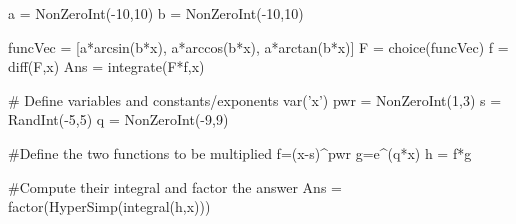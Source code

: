 

\begin{sagesilent}
a = NonZeroInt(-10,10)
b = NonZeroInt(-10,10)

funcVec = [a*arcsin(b*x), a*arccos(b*x), a*arctan(b*x)]
F = choice(funcVec)
f = diff(F,x)
Ans = integrate(F*f,x)
\end{sagesilent}


















\begin{sagesilent}
# Define variables and constants/exponents
var('x')
pwr = NonZeroInt(1,3)
s = RandInt(-5,5)
q = NonZeroInt(-9,9)

#Define the two functions to be multiplied
f=(x-s)^pwr
g=e^(q*x)
h = f*g

#Compute their integral and factor the answer
Ans = factor(HyperSimp(integral(h,x)))
\end{sagesilent}

